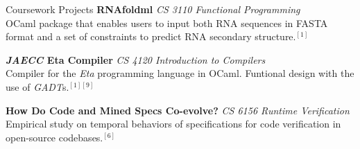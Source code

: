  
\begin{rSection}{Coursework Projects}
	\textbf{RNAfoldml} \textit{CS 3110 Functional Programming} \href{https://github.com/jpVinnie/RNAfoldml/}{\ExternalLink} \\
	OCaml package that enables users to input both RNA sequences in FASTA format and a set of constraints to predict RNA secondary structure.$^{[1]}$

	\textbf{\textit{JAECC} Eta Compiler} \textit{CS 4120 Introduction to Compilers} \\
	Compiler for the \textit{Eta} programming language in OCaml. Funtional design with the use of \textit{GADT}s.$^{[1][9]}$ 

	\textbf{How Do Code and Mined Specs Co-evolve?} \textit{CS 6156 Runtime Verification} \\
	Empirical study on temporal behaviors of specifications for code verification in open-source codebases.$^{[6]}$ 

\end{rSection}